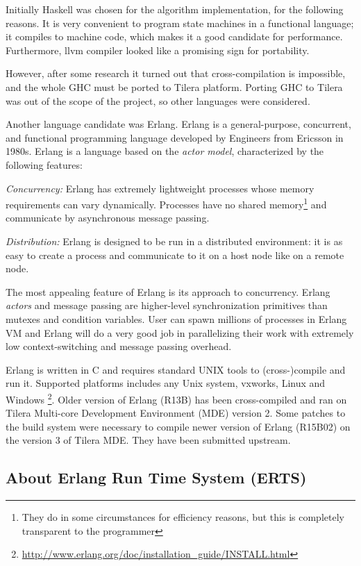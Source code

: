 \documentclass[english,11pt]{l4proj}
\begin{document}
Initially Haskell was chosen for the algorithm implementation, for the following
reasons. It is very convenient to program state machines in a functional
language; it compiles to machine code, which makes it a good candidate for
performance. Furthermore, llvm compiler looked like a promising sign for
portability.

However, after some research it turned out that cross-compilation is impossible,
and the whole GHC must be ported to Tilera platform. Porting GHC to Tilera was
out of the scope of the project, so other languages were considered.

Another language candidate was Erlang. Erlang is a general-purpose, concurrent,
and functional programming language developed by Engineers from Ericsson in
1980s. Erlang is a language based on the  {\em actor model}, characterized by
the following features:

{\em Concurrency:} Erlang has extremely lightweight processes whose memory
requirements can vary dynamically. Processes have no shared
memory\footnote{They do in some circumstances for efficiency reasons, but this
is completely transparent to the programmer} and communicate by asynchronous
message passing.

{\em Distribution:} Erlang is designed to be run in a distributed
environment: it is as easy to create a process and communicate to
it on a host node like on a remote node.

The most appealing feature of Erlang is its approach to concurrency. Erlang {\em
actors} and message passing are higher-level synchronization primitives than
mutexes and condition variables. User can spawn millions of processes in Erlang
VM and Erlang will do a very good job in parallelizing their work with extremely
low context-switching and message passing overhead.

Erlang is written in C and requires standard UNIX tools to (cross-)compile and
run it. Supported platforms includes any Unix system, vxworks, Linux and
Windows
\footnote{\url{http://www.erlang.org/doc/installation\_guide/INSTALL.html}}.
Older version of Erlang (R13B) has been cross-compiled and ran on Tilera
Multi-core Development Environment (MDE) version 2. Some patches to the build
system were necessary to compile newer version of Erlang (R15B02) on the
version 3 of Tilera MDE. They have been submitted upstream.

\subsection{About Erlang Run Time System (ERTS)}
\end{document}
